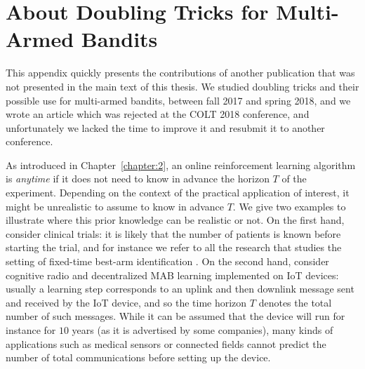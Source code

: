 \chapter{About Doubling Tricks for Multi-Armed Bandits}
\label{app:2:DoublingTricks}

This appendix quickly presents the contributions of another publication that was not presented in the main text of this thesis.
We studied doubling tricks and their possible use for multi-armed bandits, between fall 2017 and spring 2018, and we wrote an article \cite{Besson2018DoublingTricks} which was rejected at the COLT 2018 conference, and unfortunately we lacked the time to improve it and resubmit it to another conference.




As introduced in Chapter~\ref{chapter:2},
an online reinforcement learning algorithm is \emph{anytime} if it does not need to know in advance the horizon $T$ of the experiment.
%
Depending on the context of the practical application of interest, it might be unrealistic to assume to know in advance $T$. We give two examples to illustrate where this prior knowledge can be realistic or not.
On the first hand, consider clinical trials: it is likely that the number of patients is known before starting the trial, and for instance we refer to all the research that studies the setting of fixed-time best-arm identification \cite{audibert2010best,Garivier16BAI}.
On the second hand, consider cognitive radio and decentralized MAB learning implemented on IoT devices: usually a learning step corresponds to an uplink and then downlink message sent and received by the IoT device, and so the time horizon $T$ denotes the total number of such messages. While it can be assumed that the device will run for instance for $10$ years (as it is advertised by some companies), many kinds of applications such as medical sensors or connected fields cannot predict the number of total communications before setting up the device.

